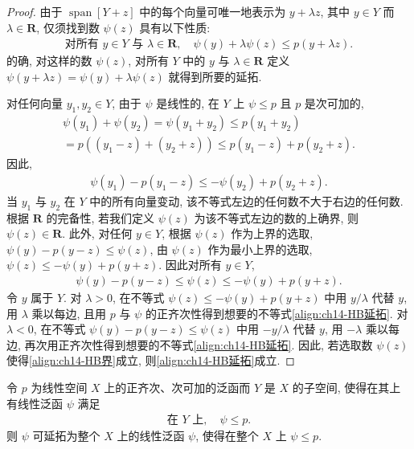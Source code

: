 \documentclass[../../main.tex]{subfiles}
\begin{document}
\begin{proof}
由于 $\operatorname{span}[Y+z]$ 中的每个向量可唯一地表示为 $y+\lambda z$, 其中 $y\in Y$ 而 $\lambda\in\mathbf{R}$, 仅须找到数 $\psi(z)$ 具有以下性质:
\begin{align}
\text{对所有 }y\in Y\text{ 与 }\lambda\in\mathbf{R},\quad\psi(y)+\lambda\psi(z)\leqslant p(y+\lambda z).\label{align:ch14-HB延拓}
\end{align}
的确, 对这样的数 $\psi(z)$, 对所有 $Y$ 中的 $y$ 与 $\lambda\in\mathbf{R}$ 定义 $\psi(y+\lambda z)=\psi(y)+\lambda\psi(z)$ 就得到所要的延拓.

对任何向量 $y_{1},y_{2}\in Y$, 由于 $\psi$ 是线性的, 在 $Y$ 上 $\psi\leqslant p$ 且 $p$ 是次可加的,
\begin{align*}
\psi(y_{1})+\psi(y_{2})=\psi(y_{1}+y_{2})\leqslant p(y_{1}+y_{2})\\
=p((y_{1}-z)+(y_{2}+z))\leqslant p(y_{1}-z)+p(y_{2}+z).
\end{align*}
因此,
\begin{align*}
\psi(y_{1})-p(y_{1}-z)\leqslant-\psi(y_{2})+p(y_{2}+z).
\end{align*}
当 $y_{1}$ 与 $y_{2}$ 在 $Y$ 中的所有向量变动, 该不等式左边的任何数不大于右边的任何数. 根据 $\mathbf{R}$ 的完备性, 若我们定义 $\psi(z)$ 为该不等式左边的数的上确界, 则 $\psi(z)\in\mathbf{R}$. 此外, 对任何 $y\in Y$, 根据 $\psi(z)$ 作为上界的选取, $\psi(y)-p(y-z)\leqslant\psi(z)$, 由 $\psi(z)$ 作为最小上界的选取, $\psi(z)\leqslant-\psi(y)+p(y+z)$. 因此对所有 $y\in Y$,
\begin{align}
\psi(y)-p(y-z)\leqslant\psi(z)\leqslant-\psi(y)+p(y+z).\label{align:ch14-HB界}
\end{align}
令 $y$ 属于 $Y$. 对 $\lambda>0$, 在不等式 $\psi(z)\leqslant-\psi(y)+p(y+z)$ 中用 $y/\lambda$ 代替 $y$, 用 $\lambda$ 乘以每边, 且用 $p$ 与 $\psi$ 的正齐次性得到想要的不等式\eqref{align:ch14-HB延拓}. 对 $\lambda<0$, 在不等式 $\psi(y)-p(y-z)\leqslant\psi(z)$ 中用 $-y/\lambda$ 代替 $y$, 用 $-\lambda$ 乘以每边, 再次用正齐次性得到想要的不等式\eqref{align:ch14-HB延拓}. 因此, 若选取数 $\psi(z)$ 使得\eqref{align:ch14-HB界}成立, 则\eqref{align:ch14-HB延拓}成立.
\end{proof}

\begin{theorem}\label{theorem:ch14-HB}
令 $p$ 为线性空间 $X$ 上的正齐次、次可加的泛函而 $Y$ 是 $X$ 的子空间, 使得在其上有线性泛函 $\psi$ 满足
\begin{align*}
\text{在 }Y\text{ 上},\quad\psi\leqslant p.
\end{align*}
则 $\psi$ 可延拓为整个 $X$ 上的线性泛函 $\psi$, 使得在整个 $X$ 上 $\psi\leqslant p$.
\end{theorem}
\end{document}
